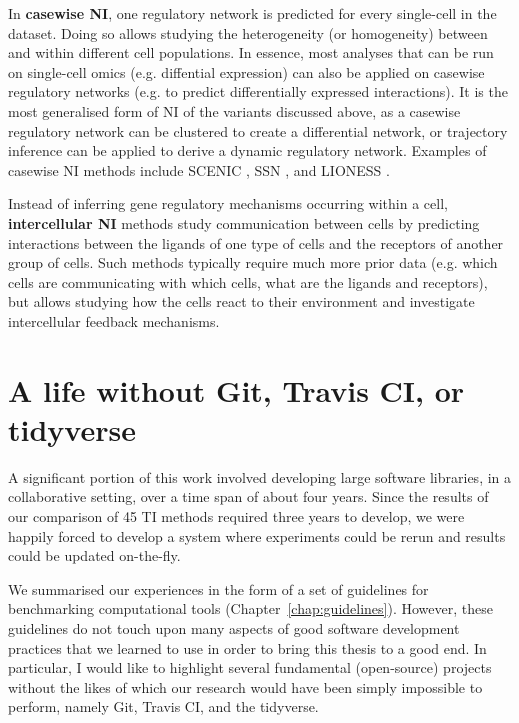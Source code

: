 In \textbf{casewise NI}, one regulatory network is predicted for every single-cell in the dataset. Doing so allows studying the heterogeneity (or homogeneity) between and within different cell populations. In essence, most analyses that can be run on single-cell omics (e.g. diffential expression) can also be applied on casewise regulatory networks (e.g. to predict differentially expressed interactions).
It is the most generalised form of NI of the variants discussed above, as a casewise regulatory network can be clustered to create a differential network, or trajectory inference can be applied to derive a dynamic regulatory network. Examples of casewise NI methods include SCENIC \cite{aibar_scenicsinglecellregulatory_2017}, SSN \cite{liu_personalizedcharacterizationdiseases_2016}, and LIONESS \cite{kuijjer_estimatingsamplespecificregulatory_2019}.

Instead of inferring gene regulatory mechanisms occurring within a cell, \textbf{intercellular NI} methods \cite{efremova_cellphonedbv2inferring_2019,browaeys_nichenetmodelingintercellular_2019} study communication between cells by predicting interactions between the ligands of one type of cells and the receptors of another group of cells. Such methods typically require much more prior data (e.g. which cells are communicating with which cells, what are the ligands and receptors), but allows studying how the cells react to their environment and investigate intercellular feedback mechanisms. 



\section{A life without Git, Travis CI, or tidyverse}
A significant portion of this work involved developing large software libraries, in a collaborative setting, over a time span of about four years. Since the results of our comparison of 45 TI methods required three years to develop, we were happily forced to develop a system where experiments could be rerun and results could be updated on-the-fly.

We summarised our experiences in the form of a set of guidelines for benchmarking computational tools (Chapter~\ref{chap:guidelines}). However, these guidelines do not touch upon many aspects of good software development practices that we learned to use in order to bring this thesis to a good end. In particular, I would like to highlight several  fundamental (open-source) projects without the likes of which our research would have been simply impossible to perform, namely Git, Travis CI, and the tidyverse.

